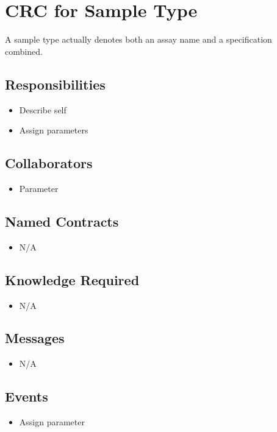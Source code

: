 \documentclass[11pt,twocolumn]{article}
\begin{document}
\section*{CRC for Sample Type}
 A sample type actually denotes both an assay name and a specification combined. 
\subsection*{Responsibilities}
\begin{itemize}
\item Describe self
\item Assign parameters
\end{itemize}

\subsection*{Collaborators}
\begin{itemize}
\item Parameter
\end{itemize}

\subsection*{Named Contracts}
\begin{itemize}
\item N/A
\end{itemize}

\subsection*{Knowledge Required}
\begin{itemize}
\item N/A
\end{itemize}

\subsection*{Messages}
\begin{itemize}
\item N/A
\end{itemize}

\subsection*{Events}
\begin{itemize}
\item Assign parameter
\end{itemize}
\end{document}
